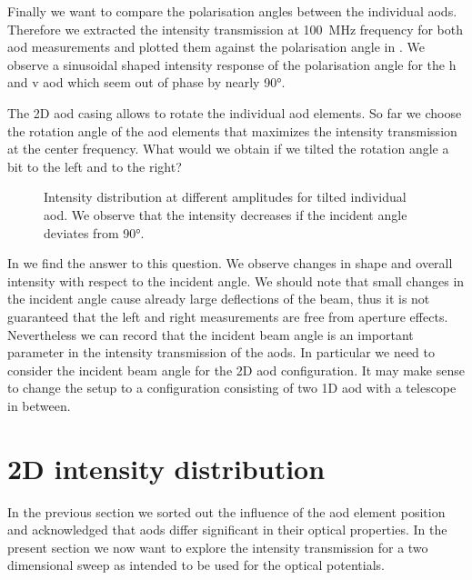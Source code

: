 Finally we want to compare the polarisation angles between the individual
\gls{aod}s. Therefore we extracted the intensity transmission at
\SI{100}{\mega\hertz} frequency for both \gls{aod} measurements and plotted
them against the polarisation angle in . We
observe a sinusoidal shaped intensity response of the polarisation angle
for the \gls{h} and \gls{v} \gls{aod} which seem out of phase by nearly
\ang{90}.

The 2D \gls{aod} casing allows to rotate the individual \gls{aod} elements. So
far we choose the rotation angle of the \gls{aod} elements that maximizes the
intensity transmission at the center frequency. What would we obtain if we
tilted the rotation angle a bit to the left and to the right?
\begin{figure}[htb]
  \centering
  \begin{adjustbox}{width=\textwidth}
  \end{adjustbox}
  \caption{Intensity distribution at different amplitudes for tilted
    individual \gls{aod}. We observe that the intensity decreases if the
    incident angle deviates from \ang{90}.
  }\label{fig:intensity_distribution_tilted}
\end{figure}
In  we find the answer to this
question. We observe changes in shape and overall intensity with respect
to the incident angle. We should note that small changes in the incident
angle cause already large deflections of the beam, thus it is not guaranteed
that the left and right measurements are free from aperture effects.
Nevertheless we can record that the incident beam angle is an important
parameter in the intensity transmission of the \gls{aod}s. In particular we
need to consider the incident beam angle for the 2D \gls{aod} configuration.
It may make sense to change the setup to a configuration consisting of two
1D \gls{aod} with a telescope in between.

\section{2D intensity distribution}

In the previous section we sorted out the influence of the \gls{aod} element
position and acknowledged that \gls{aod}s differ significant in their
optical properties. In the present section we now want to explore the
intensity transmission for a two dimensional sweep as intended to be used
for the optical potentials.

